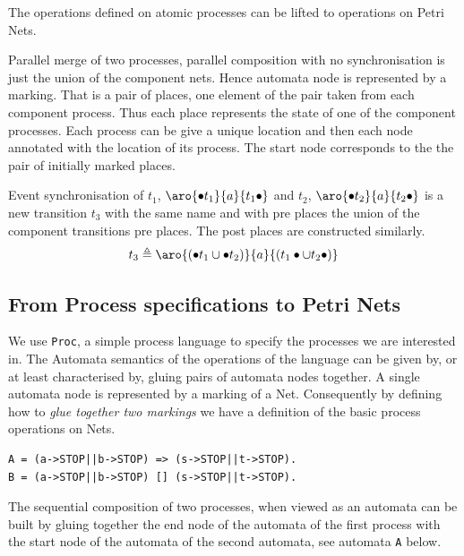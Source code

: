 \documentclass[]{article}
\begin{document}
The operations defined on atomic processes can be lifted to operations on Petri Nets.

Parallel merge of two processes, parallel composition with no synchronisation is just the union of the component nets. Hence automata node is represented by a marking. That is a pair of places, one element of the pair taken from each component process. Thus each place represents the state of one of the component processes. Each process can be give a unique location and then each node annotated with the location of its process.
The start node corresponds to the the pair of initially marked places.

Event synchronisation of $t_1$, $\aro{\bullet t_1}{a}{t_1\bullet}$ and $t_2$, $\aro{\bullet t_2}{a}{t_2\bullet}$ is a new transition $t_3$ with the same name and with pre places the union of the component transitions pre places. The post places are constructed similarly.
\[t_3\triangleq \aro{(\bullet t_1\cup \bullet t_2)}{a}{(t_1\bullet \cup t_2\bullet) }\]





\subsection{From Process specifications to Petri Nets}
We use \verb|Proc|, a simple process language to specify the processes we are interested in. The Automata semantics of the operations of the language can be given by, or at least characterised by, gluing pairs of automata nodes together. A single automata node is represented by a marking of a Net.  Consequently by  defining how to \emph{glue together two markings} we have a definition of the basic process operations on Nets.


\begin{center}\begin{minipage}{0.6\textwidth}
\begin{verbatim}
A = (a->STOP||b->STOP) => (s->STOP||t->STOP).
B = (a->STOP||b->STOP) [] (s->STOP||t->STOP).
  \end{verbatim}
\end{minipage}\end{center}

The sequential composition of two processes, when viewed as an automata  can be built by gluing together the end node of the automata of the first process with the start node of the automata of the second automata, see automata \verb|A| below.
\end{document}
